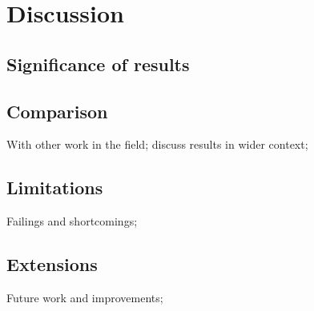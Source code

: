 \section{Discussion}
% 

\subsection{Significance of results}

\subsection{Comparison}
With other work in the field; discuss results in wider context;

\subsection{Limitations}
Failings and shortcomings;

\subsection{Extensions}
Future work and improvements;

